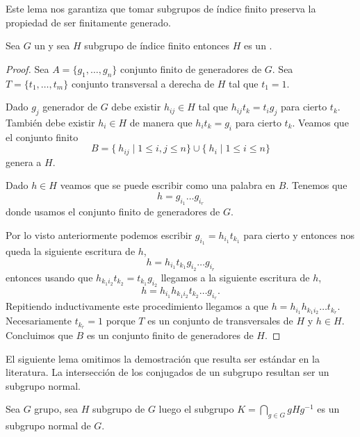 \documentclass[tesis.tex]{subfiles}
\begin{document}
Este lema nos garantiza que tomar subgrupos de índice finito preserva la propiedad de ser finitamente generado.

\begin{lema}\label{lema_subg_fg}
	Sea $G$ un \fg y sea $H$ subgrupo de índice finito entonces $H$ es un \fg.
\end{lema}
\begin{proof}
	Sea $A = \{g_1, \dots, g_n\}$ conjunto finito de generadores de $G$.
	Sea $T =\{t_1, \dots, t_m\}$ conjunto transversal a derecha de $H$ tal que $t_1=1$.
	
	Dado $g_j$ generador de $G$ debe existir $h_{ij} \in H$ tal que $h_{ij}t_{k} = t_ig_j$ para cierto $t_k$.
	También debe existir $h_i \in H$ de manera que $ h_i t_{k} = g_i$ para cierto $t_k$.
	Veamos que el conjunto finito 
	\[
	B = \{ \ h_{ ij}  \mid {1 \le i,j \le n } \} \cup \{ \ h_i \mid {1 \le i \le n} \}
	\]
	genera a $H$.
	
	Dado $h \in H$ veamos que se puede escribir como una palabra en $B$. 
	Tenemos que 
	\[
	h = g_{i_1}\dots g_{i_r}
	\]
	donde usamos el conjunto finito de generadores de $G$.
	
	Por lo visto anteriormente podemos escribir  $g_{i_1} = h_{i_1}t_{k_1}$ para cierto y entonces nos queda la siguiente escritura de $h$,
	\[
	h = h_{i_1}t_{k_1} g_{i_2}\dots g_{i_r}
	\]
	entonces usando que $h_{k_{1}i_{2}}t_{k_2} = t_{k_1}g_{i_2} $ llegamos a la siguiente escritura de $h$,
	\[
	h = h_{i_1}h_{k_{1}i_{2}}t_{k_2}\dots g_{i_r}.
	\]
	Repitiendo inductivamente este procedimiento llegamos a que $h =h_{i_1}h_{k_{1}i_{2}} \dots t_{k_r}$.
	Necesariamente $t_{k_r} = 1$ porque $T$ es un conjunto de transversales de $H$ y $h \in H$.
	Concluimos que $B$ es un conjunto finito de generadores de $H$.
	
\end{proof}


El siguiente lema omitimos la demostración que resulta ser estándar en la literatura.
La intersección de los conjugados de un subgrupo resultan ser un subgrupo normal.

\begin{lema}\label{lema_int_normal}
	Sea $G$ grupo, sea $H$ subgrupo de $G$ luego el subgrupo $K = \bigcap_{g \in G} gHg^{-1}$ es un subgrupo normal de $G$.
\end{lema}
\end{document}
